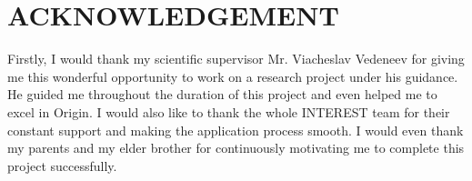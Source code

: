 \documentclass[12pt]{article}
\begin{document}
\section{ACKNOWLEDGEMENT}
Firstly, I would thank my scientific supervisor Mr. Viacheslav Vedeneev for giving me this wonderful opportunity to work on a research project under his guidance. He guided me throughout the duration of this project and even helped me to excel in Origin. I would also like to thank the whole INTEREST team for their constant support and making the application process smooth. I would even thank my parents and my elder brother for continuously motivating me to complete this project successfully. 



\end{document}
